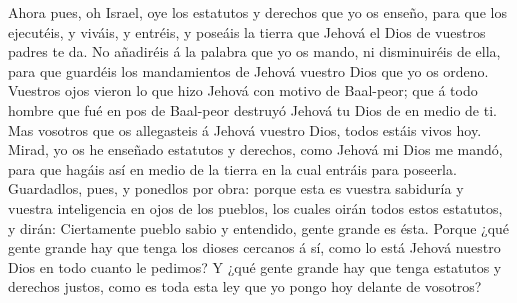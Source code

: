  Ahora pues, oh Israel, oye los estatutos y derechos que yo
os enseño, para que los ejecutéis, y viváis, y entréis, y poseáis la
tierra que Jehová el Dios de vuestros padres te da.  No
añadiréis á la palabra que yo os mando, ni disminuiréis de ella, para
que guardéis los mandamientos de Jehová vuestro Dios que yo os ordeno.
 Vuestros ojos vieron lo que hizo Jehová con motivo de
Baal-peor; que á todo hombre que fué en pos de Baal-peor destruyó Jehová
tu Dios de en medio de ti.  Mas vosotros que os allegasteis
á Jehová vuestro Dios, todos estáis vivos hoy.  Mirad, yo os
he enseñado estatutos y derechos, como Jehová mi Dios me mandó, para que
hagáis así en medio de la tierra en la cual entráis para poseerla.
 Guardadlos, pues, y ponedlos por obra: porque esta es
vuestra sabiduría y vuestra inteligencia en ojos de los pueblos, los
cuales oirán todos estos estatutos, y dirán: Ciertamente pueblo sabio y
entendido, gente grande es ésta.  Porque ¿qué gente grande
hay que tenga los dioses cercanos á sí, como lo está Jehová nuestro Dios
en todo cuanto le pedimos?  Y ¿qué gente grande hay que
tenga estatutos y derechos justos, como es toda esta ley que yo pongo
hoy delante de vosotros?

